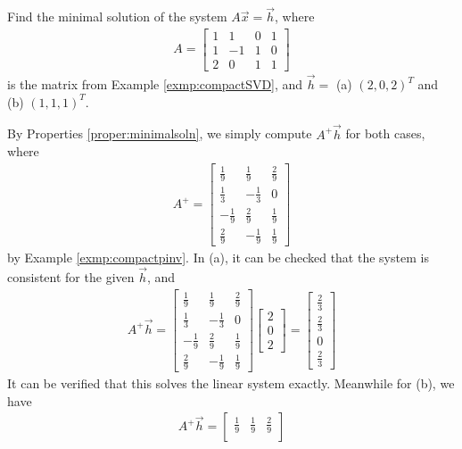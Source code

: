 \begin{exmp}
\label{exmp:minsol2h}
Find the minimal solution of the system $A\vec{x} = \vec{h}$, where 
\begin{align*}
A = 
\begin{bmatrix}
1&1&0&1\\ 
1&-1&1&0\\ 
2&0&1&1
\end{bmatrix}
\end{align*}    
is the matrix from Example \ref{exmp:compactSVD}, and $\vec{h} = $ (a) $(2,0,2)^T$ and (b) $(1,1,1)^T$.
\end{exmp}
\begin{solution}
By Properties \ref{proper:minimalsoln}, we simply compute $A^+\vec{h}$ for both cases, where
\begin{align*}
A^+ =
\begin{bmatrix}
\frac{1}{9}&\frac{1}{9}&\frac{2}{9}\\ 
\frac{1}{3}&-\frac{1}{3}&0\\ 
-\frac{1}{9}&\frac{2}{9}&\frac{1}{9}\\ 
\frac{2}{9}&-\frac{1}{9}&\frac{1}{9}
\end{bmatrix}
\end{align*}
by Example \ref{exmp:compactpinv}. In (a), it can be checked that the system is consistent for the given $\vec{h}$, and
\begin{align*}
A^+\vec{h} = 
\begin{bmatrix}
\frac{1}{9}&\frac{1}{9}&\frac{2}{9}\\ 
\frac{1}{3}&-\frac{1}{3}&0\\ 
-\frac{1}{9}&\frac{2}{9}&\frac{1}{9}\\ 
\frac{2}{9}&-\frac{1}{9}&\frac{1}{9}
\end{bmatrix}
\begin{bmatrix}
2 \\
0 \\
2
\end{bmatrix}
=
\begin{bmatrix}
\frac{2}{3}\\ 
\frac{2}{3}\\
0\\ 
\frac{2}{3}
\end{bmatrix}
\end{align*}
It can be verified that this solves the linear system exactly. Meanwhile for (b), we have
\begin{align*}
A^+\vec{h} = 
\begin{bmatrix}
\frac{1}{9}&\frac{1}{9}&\frac{2}{9}\\ 

\end{bmatrix}
\end{align*}
\end{solution}
